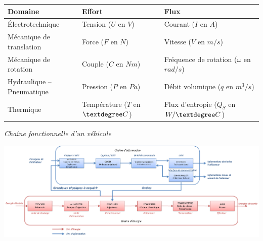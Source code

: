 \documentclass[11pt,oneside]{article}
\begin{document}
\begin{exemple}
\begin{center}
\begin{tabular}{|l|l|l|}
\hline
\textbf{Domaine} & \textbf{Effort} & \textbf{Flux} \\
\hline
\hline
Électrotechnique & Tension ($U$ en $V$) & Courant ($I$ en $A$) \\
\hline
Mécanique de translation & Force ($F$ en $N$) & Vitesse ($V$ en $m/s$) \\
\hline
Mécanique de rotation & Couple ($C$ en $Nm$) & Fréquence de rotation ($\omega$ en $rad/s$) \\
\hline
Hydraulique -- Pneumatique & Pression ($P$ en $Pa$) & Débit volumique ($q$ en $m^3/s$)\\
\hline
Thermique & Température ($T$ en $\textdegree C$) & Flux d'entropie ($Q_S$ en $W/\textdegree C$)\\
\hline
\end{tabular}
\end{center}
\end{exemple}

\begin{exemple}
\textit{Chaîne fonctionnelle d'un véhicule}

\begin{center}
\includegraphics[width=\textwidth]{png/chaine_fonc_ex}
\end{center}
\end{exemple}
\end{document}
